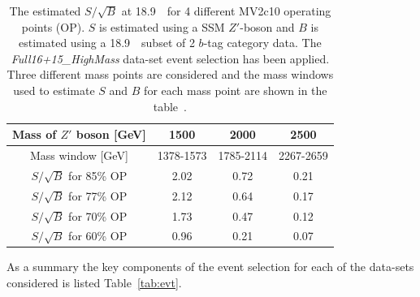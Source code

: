 \begin{table}[ht]
\begin{center}
\begin{tabular}{|c||c|c|c|}
  \hline
  Mass of $Z'$ boson [GeV]        &  1500  &   2000  &  2500  \\
  \hline
  Mass window [GeV]               & 1378-1573       &  1785-2114   &  2267-2659 \\
  \hline
  $S/\sqrt{B}$ for 85\% OP        &  2.02           &  0.72        &  0.21          \\
  $S/\sqrt{B}$ for 77\% OP        &  2.12           &  0.64        &  0.17          \\
  $S/\sqrt{B}$ for 70\% OP        &  1.73           &  0.47        &  0.12          \\
  $S/\sqrt{B}$ for 60\% OP        &  0.96           &  0.21        &  0.07          \\ \hline
\end{tabular}
\caption{The estimated $S/\sqrt{B}$ at 18.9~\ifb~for 4 different MV2c10 operating points (OP).
  $S$ is estimated using a SSM $Z'$-boson and $B$ is estimated using a 18.9~\ifb~subset of 2 $b$-tag category data.
  The \textit{Full16+15\_HighMass} data-set event selection has been applied.
  Three different mass points are considered and the mass windows used
  to estimate $S$ and $B$ for each mass point are shown in the table~\cite{dibjet-ichep_int}.}
\label{tab:evt-btag_hm}
\end{center}
\end{table}

As a summary the  key components
of the event selection
for each of the data-sets considered
is listed Table~\ref{tab:evt}.

